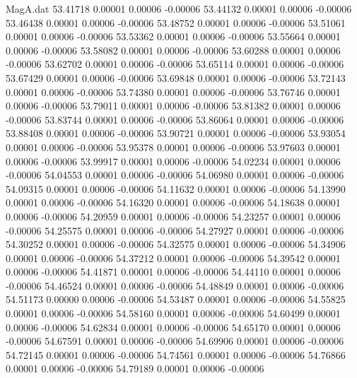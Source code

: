 \begin{filecontents}{MagA.dat}
  53.41718    0.00001    0.00006   -0.00006
  53.44132    0.00001    0.00006   -0.00006
  53.46438    0.00001    0.00006   -0.00006
  53.48752    0.00001    0.00006   -0.00006
  53.51061    0.00001    0.00006   -0.00006
  53.53362    0.00001    0.00006   -0.00006
  53.55664    0.00001    0.00006   -0.00006
  53.58082    0.00001    0.00006   -0.00006
  53.60288    0.00001    0.00006   -0.00006
  53.62702    0.00001    0.00006   -0.00006
  53.65114    0.00001    0.00006   -0.00006
  53.67429    0.00001    0.00006   -0.00006
  53.69848    0.00001    0.00006   -0.00006
  53.72143    0.00001    0.00006   -0.00006
  53.74380    0.00001    0.00006   -0.00006
  53.76746    0.00001    0.00006   -0.00006
  53.79011    0.00001    0.00006   -0.00006
  53.81382    0.00001    0.00006   -0.00006
  53.83744    0.00001    0.00006   -0.00006
  53.86064    0.00001    0.00006   -0.00006
  53.88408    0.00001    0.00006   -0.00006
  53.90721    0.00001    0.00006   -0.00006
  53.93054    0.00001    0.00006   -0.00006
  53.95378    0.00001    0.00006   -0.00006
  53.97603    0.00001    0.00006   -0.00006
  53.99917    0.00001    0.00006   -0.00006
  54.02234    0.00001    0.00006   -0.00006
  54.04553    0.00001    0.00006   -0.00006
  54.06980    0.00001    0.00006   -0.00006
  54.09315    0.00001    0.00006   -0.00006
  54.11632    0.00001    0.00006   -0.00006
  54.13990    0.00001    0.00006   -0.00006
  54.16320    0.00001    0.00006   -0.00006
  54.18638    0.00001    0.00006   -0.00006
  54.20959    0.00001    0.00006   -0.00006
  54.23257    0.00001    0.00006   -0.00006
  54.25575    0.00001    0.00006   -0.00006
  54.27927    0.00001    0.00006   -0.00006
  54.30252    0.00001    0.00006   -0.00006
  54.32575    0.00001    0.00006   -0.00006
  54.34906    0.00001    0.00006   -0.00006
  54.37212    0.00001    0.00006   -0.00006
  54.39542    0.00001    0.00006   -0.00006
  54.41871    0.00001    0.00006   -0.00006
  54.44110    0.00001    0.00006   -0.00006
  54.46524    0.00001    0.00006   -0.00006
  54.48849    0.00001    0.00006   -0.00006
  54.51173    0.00000    0.00006   -0.00006
  54.53487    0.00001    0.00006   -0.00006
  54.55825    0.00001    0.00006   -0.00006
  54.58160    0.00001    0.00006   -0.00006
  54.60499    0.00001    0.00006   -0.00006
  54.62834    0.00001    0.00006   -0.00006
  54.65170    0.00001    0.00006   -0.00006
  54.67591    0.00001    0.00006   -0.00006
  54.69906    0.00001    0.00006   -0.00006
  54.72145    0.00001    0.00006   -0.00006
  54.74561    0.00001    0.00006   -0.00006
  54.76866    0.00001    0.00006   -0.00006
  54.79189    0.00001    0.00006   -0.00006

\end{filecontents}
